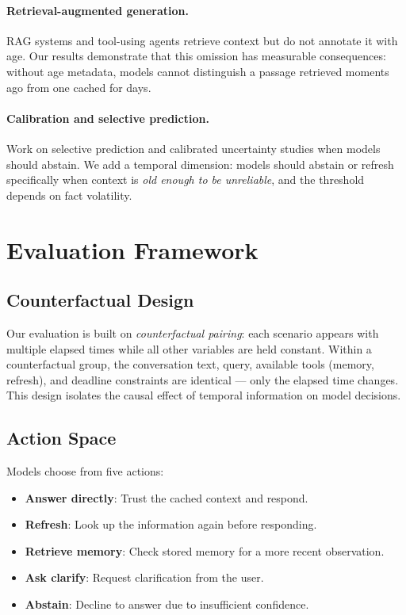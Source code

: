 \documentclass[11pt,a4paper]{article}
\begin{document}
\paragraph{Retrieval-augmented generation.}
RAG systems \citep{lewis2020retrieval} and tool-using agents \citep{schick2023toolformer} retrieve context but do not annotate it with age.
Our results demonstrate that this omission has measurable consequences: without age metadata, models cannot distinguish a passage retrieved moments ago from one cached for days.

\paragraph{Calibration and selective prediction.}
Work on selective prediction \citep{kamath2020selective} and calibrated uncertainty \citep{kadavath2022language} studies when models should abstain.
We add a temporal dimension: models should abstain or refresh specifically when context is \emph{old enough to be unreliable}, and the threshold depends on fact volatility.

\section{Evaluation Framework}
\label{sec:framework}

\subsection{Counterfactual Design}

Our evaluation is built on \emph{counterfactual pairing}: each scenario appears with multiple elapsed times while all other variables are held constant.
Within a counterfactual group, the conversation text, query, available tools (memory, refresh), and deadline constraints are identical --- only the elapsed time changes.
This design isolates the causal effect of temporal information on model decisions.

\subsection{Action Space}

Models choose from five actions:
\begin{itemize}
    \item \textbf{Answer directly}: Trust the cached context and respond.
    \item \textbf{Refresh}: Look up the information again before responding.
    \item \textbf{Retrieve memory}: Check stored memory for a more recent observation.
    \item \textbf{Ask clarify}: Request clarification from the user.
    \item \textbf{Abstain}: Decline to answer due to insufficient confidence.
\end{itemize}
\end{document}
